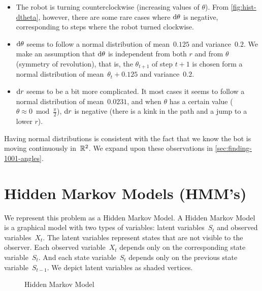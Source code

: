 \documentclass[twoside]{article}
\begin{document}
\begin{itemize}
\item The robot is turning counterclockwise (increasing values of $\theta$).
  From \cref{fig:hist-dtheta}, however, there are some rare cases where ${\mathop{}\!\mathrm{d} \theta}$ is negative, corresponding to steps where the robot turned clockwise.
\item ${\mathop{}\!\mathrm{d} \theta}$ seems to follow a normal distribution of mean~$0.125$ and variance~$0.2$.
  We make an assumption that ${\mathop{}\!\mathrm{d} \theta}$ is independent from both $r$ and from $\theta$ (symmetry of revolution), that is, the $\theta_{t+1}$ of step ${t+1}$ is chosen form a normal distribution of mean~${\theta_t + 0.125}$ and variance~$0.2$.
\item ${\mathop{}\!\mathrm{d} r}$ seems to be a bit more complicated.
  It most cases it seems to follow a normal distribution of mean~$0.0231$, and when $\theta$ has a certain value ($\theta \approx 0 \bmod \frac{\pi}{2}$), ${\mathop{}\!\mathrm{d} r}$ is negative (there is a kink in the path and a jump to a lower $r$).
\end{itemize}
Having normal distributions is consistent with the fact that we know the bot is moving continuously in~$\mathbb{R}^2$.
We expand upon these observations in \cref{sec:finding-1001-angles}.

\section{Hidden Markov Models (HMM's)}\label{sec:hidden-markov-models}

We represent this problem as a Hidden Markov Model.
A Hidden Markov Model is a graphical model with two types of variables: latent variables~$S_t$ and observed variables~$X_t$.
The latent variables represent states that are not visible to the observer.
Each observed variable~$X_t$ depends only on the corresponding state variable~$S_t$.
And each state variable~$S_t$ depends only on the previous state variable~$S_{t-1}$.
We depict latent variables as shaded vertices.

\begin{figure}[h]
  \centering
  \caption{Hidden Markov Model}\label{fig:hmm}
\end{figure}
\end{document}
